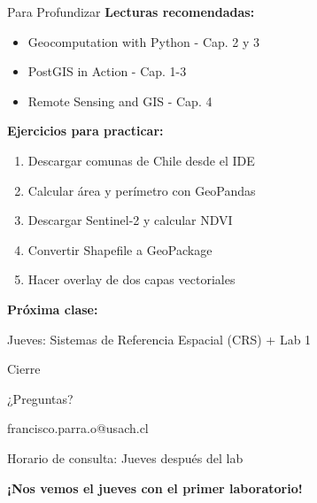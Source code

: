 \documentclass[10pt]{beamer}
\begin{document}
\begin{frame}{Para Profundizar}
    \textbf{Lecturas recomendadas:}
    \begin{itemize}
        \item Geocomputation with Python - Cap. 2 y 3
        \item PostGIS in Action - Cap. 1-3
        \item Remote Sensing and GIS - Cap. 4
    \end{itemize}
    
    \vspace{0.3cm}
    
    \textbf{Ejercicios para practicar:}
    \begin{enumerate}
        \item Descargar comunas de Chile desde el IDE
        \item Calcular área y perímetro con GeoPandas
        \item Descargar Sentinel-2 y calcular NDVI
        \item Convertir Shapefile a GeoPackage
        \item Hacer overlay de dos capas vectoriales
    \end{enumerate}
    
    \vspace{0.3cm}
    
    \textbf{Próxima clase:} 
    \begin{tcolorbox}[colframe=usachblue,colback=blue!5]
        Jueves: Sistemas de Referencia Espacial (CRS) + Lab 1
    \end{tcolorbox}
\end{frame}

\begin{frame}{Cierre}
    \begin{center}
        \Large{¿Preguntas?}
        
        \vspace{1cm}
        
         francisco.parra.o@usach.cl
        
        \vspace{0.5cm}
        
         Horario de consulta: Jueves después del lab
        
        \vspace{1cm}
        
        \textbf{¡Nos vemos el jueves con el primer laboratorio!}
    \end{center}
\end{frame}
\end{document}

